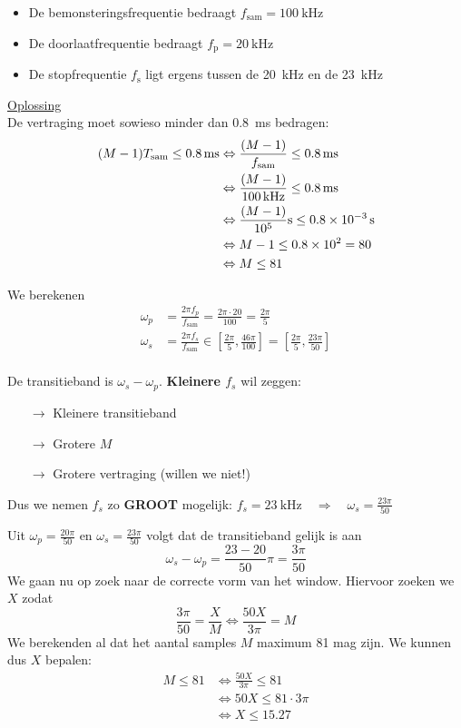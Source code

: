 \documentclass[kulak]{kulakarticle}
\newcommand{\sam}{\text{sam}}
\begin{document}
	\begin{itemize}
		\item De bemonsteringsfrequentie bedraagt \(f_{\text{sam}}=\SI{100}{\kilo\hertz}\)
		\item De doorlaatfrequentie bedraagt \(f_{\text{p}}=\SI{20}{\kilo\hertz}\)
		\item De stopfrequentie \(f_{\text{s}}\) ligt ergens tussen de \SI{20}{\kilo\hertz} en de \SI{23}{\kilo\hertz}
	\end{itemize}

	\underline{Oplossing}\\

	De vertraging moet sowieso minder dan \SI{0.8}{\milli\second} bedragen:
	\begin{align*}
		(M-1) T_\sam \leq \SI{0.8}{\milli\second} &\Leftrightarrow \frac{(M-1)}{f_\sam}\leq \SI{0.8}{\milli\second} \\
		& \Leftrightarrow \frac{(M-1)}{\SI{100}{\kilo\hertz}}\leq \SI{0.8}{\milli\second} \\
		& \Leftrightarrow \frac{(M-1)}{10^5} \SI{}{\second}\leq \SI{0.8e{-3}}{\second} \\
		& \Leftrightarrow M-1 \leq \SI{0.8e2}{} = 80 \\
		& \Leftrightarrow M\leq81
	\end{align*}

	We berekenen
	\begin{align*}
		\omega_p &= \frac{2\pi f_p}{f_\sam} = \frac{2\pi \cdot 20}{100} = \frac{2\pi}{5} \\
		\omega_s &= \frac{2\pi f_s}{f_\sam} \in \left[\frac{2\pi}{5},\frac{46\pi}{100}\right] = \left[\frac{2\pi}{5},\frac{23\pi}{50}\right] \\
	\end{align*}

	De transitieband is \(\omega_s-\omega_p\). \textbf{Kleinere \(f_s\)} wil zeggen:
	\begin{itemize}
		\item[\(\rightarrow\)] Kleinere transitieband
		\item[\(\rightarrow\)] Grotere \(M\)
		\item[\(\rightarrow\)] Grotere vertraging (willen we niet!)
	\end{itemize}
	Dus we nemen \(f_s\) zo \textbf{GROOT} mogelijk: \(f_s=\SI{23}{\kilo\hertz} \quad \Longrightarrow \quad \omega_s = \frac{23\pi}{50}\)

	Uit \(\omega_p = \frac{20\pi}{50}\) en \(\omega_s = \frac{23\pi}{50}\) volgt dat de transitieband gelijk is aan \[\omega_s-\omega_p=\frac{23-20}{50}\pi = \frac{3\pi}{50}\]	We gaan nu op zoek naar de correcte vorm van het window. Hiervoor zoeken we \(X\) zodat \[\frac{3\pi}{50}=\frac{X}{M} \Leftrightarrow \frac{50X}{3\pi}=M\] We berekenden al dat het aantal samples \(M\) maximum 81 mag zijn. We kunnen dus \(X\) bepalen:
	\begin{align*}
		M \leq 81 & \Leftrightarrow \frac{50X}{3\pi} \leq 81 \\
					& \Leftrightarrow 50X \leq 81 \cdot 3\pi \\
					& \Leftrightarrow X \leq 15.27
	\end{align*}
\end{document}
